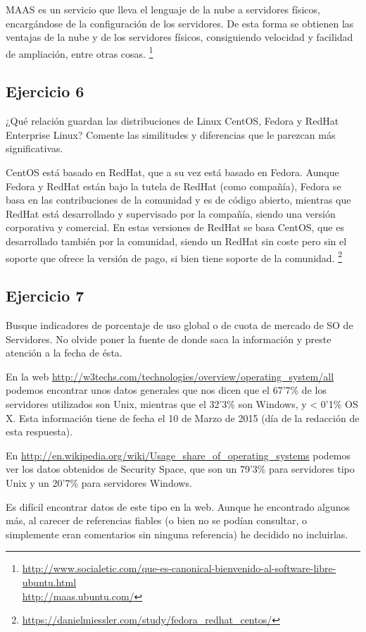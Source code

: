 \documentclass[a4paper, 11pt]{article} %
\begin{document}
MAAS es un servicio que lleva el lenguaje de la nube a servidores físicos, encargándose de la configuración de los servidores. De esta forma se obtienen las ventajas de la nube y de los servidores físicos, consiguiendo velocidad y facilidad de ampliación, entre otras cosas. 
\footnote{\url{http://www.socialetic.com/que-es-canonical-bienvenido-al-software-libre-ubuntu.html} \\ \url{http://maas.ubuntu.com/}}


\subsection*{Ejercicio 6}
¿Qué relación guardan las distribuciones de Linux CentOS, Fedora y
RedHat Enterprise Linux? Comente las similitudes y diferencias que le parezcan más
significativas.

CentOS está basado en RedHat, que a su vez está basado en Fedora. Aunque Fedora y RedHat están bajo la tutela de RedHat (como compañía), Fedora se basa en las contribuciones de la comunidad y es de código abierto, mientras que RedHat está desarrollado y supervisado por la compañía, siendo una versión corporativa y comercial. En estas versiones de RedHat se basa CentOS, que es desarrollado también por la comunidad, siendo un RedHat sin coste pero sin el soporte que ofrece la versión de pago, si bien tiene soporte de la comunidad.
\footnote{\url{https://danielmiessler.com/study/fedora_redhat_centos/}}  


\subsection*{Ejercicio 7}
Busque indicadores de porcentaje de uso global o de cuota de mercado de
SO de Servidores. No olvide poner la fuente de donde saca la información y preste
atención a la fecha de ésta.

En la web \url{http://w3techs.com/technologies/overview/operating_system/all} podemos encontrar unos datos generales que nos dicen que el 67'7\% de los servidores utilizados son Unix, mientras que el 32'3\% son Windows, y < 0'1\% OS X. Esta información tiene de fecha el 10 de Marzo de 2015 (día de la redacción de esta respuesta). 

En \url{http://en.wikipedia.org/wiki/Usage_share_of_operating_systems} podemos ver los datos obtenidos de Security Space, que son un 79'3\% para servidores tipo Unix y un 20'7\% para servidores Windows. 

Es difícil encontrar datos de este tipo en la web. Aunque he encontrado algunos más, al carecer de referencias fiables (o bien no se podían consultar, o simplemente eran comentarios sin ninguna referencia) he decidido no incluirlas. 
\end{document}
